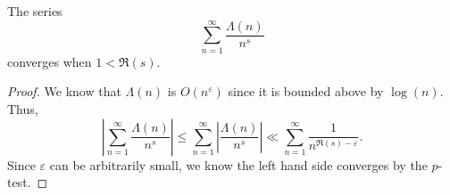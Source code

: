\begin{theorem}[vonMangoldtLSeriesSummable]
\label{vonMangoldtLSeriesSummable}
\leanok
The series
    $$\sum_{n=1}^\infty\frac{\Lambda(n)}{n^s}$$
    converges when $1<\mathfrak{R}(s)$.
\end{theorem}
\begin{proof}
\leanok
We know that $\Lambda(n)$ is $O(n^\varepsilon)$ since it is bounded above by $\log(n)$. Thus,
    $$\left|\sum_{n=1}^\infty\frac{\Lambda(n)}{n^s}\right|\leq
      \sum_{n=1}^\infty\left|\frac{\Lambda(n)}{n^s}\right|\ll
      \sum_{n=1}^\infty\frac{1}{n^{\mathfrak{R}(s)-\varepsilon}}.$$
    Since $\varepsilon$ can be arbitrarily small, we know the left hand side converges by the
    $p$-test.
\end{proof}
